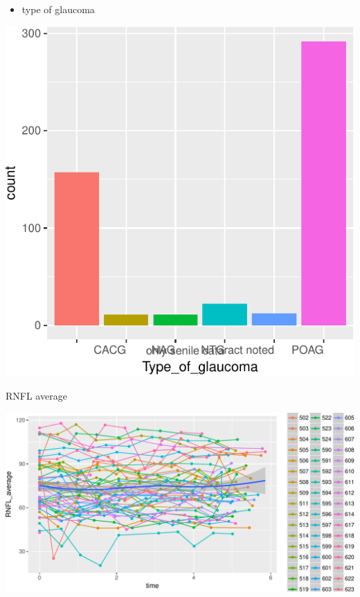 \documentclass[ignorenonframetext,]{beamer}
\providecommand{\tightlist}{%
  \setlength{\itemsep}{0pt}\setlength{\parskip}{0pt}}
\begin{document}
\begin{frame}{}

\begin{itemize}
\tightlist
\item
  type of glaucoma
\end{itemize}

\includegraphics{analisi_exp_markdown_files/figure-beamer/unnamed-chunk-5-1.pdf}

\end{frame}

\begin{frame}{RNFL average}

\includegraphics{analisi_exp_markdown_files/figure-beamer/unnamed-chunk-8-1.pdf}

\end{frame}
\end{document}

